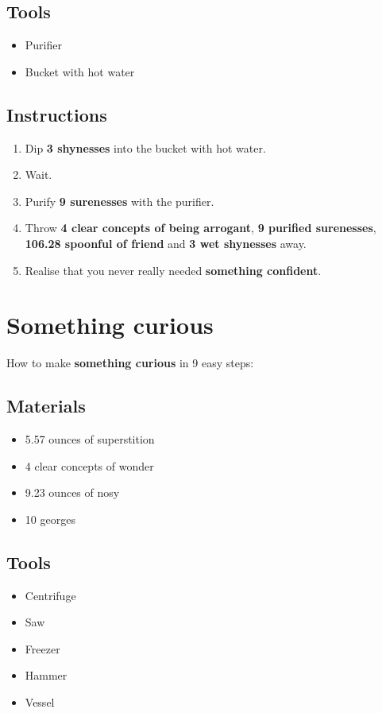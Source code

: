 \documentclass{article}
\begin{document}
\subsection{Tools}\begin{itemize}
\item 
Purifier
\item 
Bucket with hot water
\end{itemize}
\subsection{Instructions}\begin{enumerate}
\item 
Dip \textbf{3 shynesses} into the bucket with hot water.
\item 
Wait.
\item 
Purify \textbf{9 surenesses} with the purifier.
\item 
Throw \textbf{4 clear concepts of being arrogant}, \textbf{9 purified surenesses}, \textbf{106.28 spoonful of friend} and \textbf{3 wet shynesses} away.
\item 
Realise that you never really needed \textbf{something confident}.
\end{enumerate}
\newpage
\section{Something curious}How to make \textbf{something curious} in 9 easy steps:

\subsection{Materials}\begin{itemize}
\item 
5.57 ounces of superstition
\item 
4 clear concepts of wonder
\item 
9.23 ounces of nosy
\item 
10 georges
\end{itemize}
\subsection{Tools}\begin{itemize}
\item 
Centrifuge
\item 
Saw
\item 
Freezer
\item 
Hammer
\item 
Vessel
\end{itemize}
\end{document}
